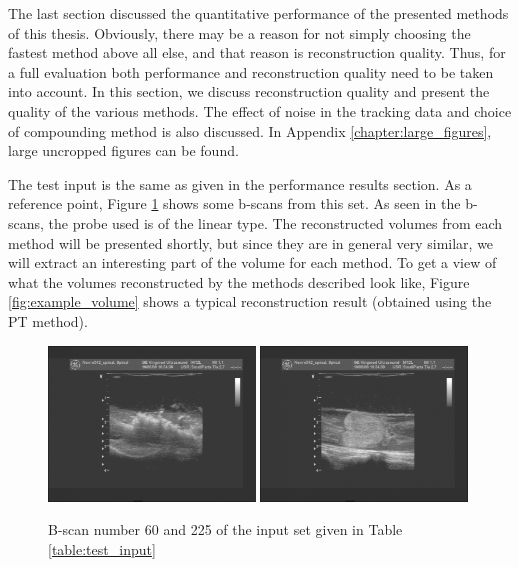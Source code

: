
The last section discussed the quantitative performance of the presented methods of this thesis. Obviously, there may be a reason for not simply choosing the fastest method above all else, and that reason is reconstruction quality. Thus, for a full evaluation both performance and reconstruction quality need to be taken into account. In this section, we discuss reconstruction quality and present the quality of the various methods. The effect of noise in the tracking data and choice of compounding method is also discussed. In Appendix \ref{chapter:large_figures}, large uncropped figures can be found.

The test input is the same as given in the performance results section. As a reference point, Figure \ref{fig:example_b-scans} shows some b-scans from this set. As seen in the b-scans, the probe used is of the linear type. The reconstructed volumes from each method will be presented shortly, but since they are in general very similar, we will extract an interesting part of the volume for each method. To get a view of what the volumes reconstructed by the methods described look like, Figure \ref{fig:example_volume} shows a typical reconstruction result (obtained using the PT method).

	\begin{figure}[h]
	\centering
	\includegraphics[width=0.49\textwidth]{graphics/60.png}
	\includegraphics[width=0.49\textwidth]{graphics/280.png}
	\caption[B-scan examples from input set]{B-scan number 60 and 225 of the input set given in Table \ref{table:test_input}}
	\label{fig:example_b-scans}
	\end{figure}
	
